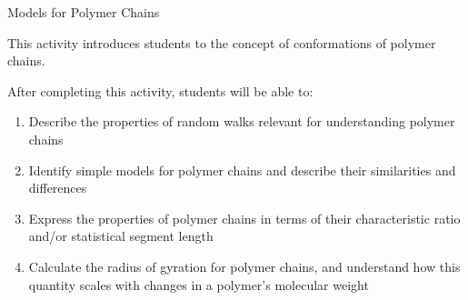 %
%
%
%

\renewcommand{\figpath}{content/polymphys/chain-confs/chain-models/figs}
\renewcommand{\labelbase}{chain-models}

\begin{activity}{Models for Polymer Chains}

\begin{instructornotes}

	This activity introduces students to the concept of conformations of polymer chains.
	
	After completing this activity, students will be able to:
			\begin{enumerate}
				\item Describe the properties of random walks relevant for understanding polymer chains
				\item Identify simple models for polymer chains and describe their similarities and differences
				\item Express the properties of polymer chains in terms of their characteristic ratio and/or statistical segment length
				\item Calculate the radius of gyration for polymer chains, and understand how this quantity scales with changes in a polymer's molecular weight
			\end{enumerate}
	
			

\end{instructornotes}
\end{activity}
